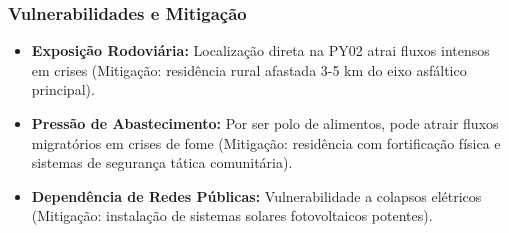 \subsubsection{Vulnerabilidades e
Mitigação}

\begin{itemize}
\tightlist
\item
  \textbf{Exposição Rodoviária:} Localização direta na PY02 atrai fluxos
  intensos em crises (Mitigação: residência rural afastada 3-5 km do
  eixo asfáltico principal).
\item
  \textbf{Pressão de Abastecimento:} Por ser polo de alimentos, pode
  atrair fluxos migratórios em crises de fome (Mitigação: residência com
  fortificação física e sistemas de segurança tática comunitária).
\item
  \textbf{Dependência de Redes Públicas:} Vulnerabilidade a colapsos
  elétricos (Mitigação: instalação de sistemas solares fotovoltaicos
  potentes).
\end{itemize}

